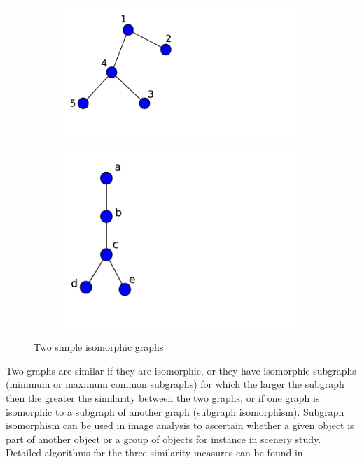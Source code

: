 \documentclass[10pt,a4paper]{article}
\theoremstyle{plain}
\theoremstyle{definition}
\begin{document}
\begin{enumerate}
     	\begin{figure}[H]
     		\centering
     		\begin{subfigure}[b]{0.35\textwidth}
     			\includegraphics[width=\textwidth]{images/graph-isomorphism1.pdf}
     			\caption{}
     			\label{isomorphic1}
     		\end{subfigure}
     		\begin{subfigure}[b]{0.35\textwidth}
     			\includegraphics[width=\textwidth]{images/graph-isomorphism2.pdf}
     			\caption{}
     			\label{isomorphic2}
     		\end{subfigure} 
     		\caption{Two simple isomorphic graphs} 
     		\label{isomorphism}
     	\end{figure}
     Two graphs are similar if they are isomorphic, or they have isomorphic subgraphs (minimum or maximum common subgraphs) for which the larger the subgraph then the greater the similarity between the two graphs, or if one graph is isomorphic to a subgraph of another graph (subgraph isomorphism). Subgraph isomorphism can be used in image analysis to ascertain whether a given object is part of another object or a group of objects for instance in scenery study. Detailed algorithms for the three similarity measures can be found in \citep{weinberg1966simple,levi1973note,ullmann1976algorithm}
     

\end{enumerate}
\end{document}
